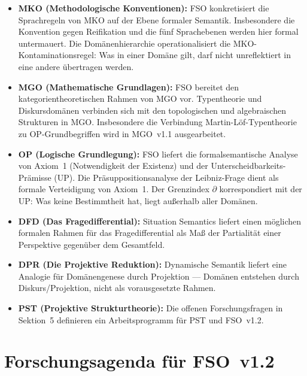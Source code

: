 \documentclass[11pt,a4paper]{article}
\theoremstyle{plain}
\theoremstyle{definition}
\begin{document}
\begin{itemize}
  \item \textbf{MKO (Methodologische Konventionen):} FSO konkretisiert die
        Sprachregeln von MKO auf der Ebene formaler Semantik. Insbesondere die
        Konvention gegen Reifikation und die f\"{u}nf Sprachebenen werden hier
        formal untermauert. Die Dom\"{a}nenhierarchie operationalisiert die
        MKO-Kontaminationsregel: Was in einer Dom\"{a}ne gilt, darf nicht
        unreflektiert in eine andere \"{u}bertragen werden.
  \item \textbf{MGO (Mathematische Grundlagen):} FSO bereitet den
        kategorientheoretischen Rahmen von MGO vor. Typentheorie und
        Diskursdom\"{a}nen verbinden sich mit den topologischen und algebraischen
        Strukturen in MGO. Insbesondere die Verbindung Martin-L\"{o}f-Typentheorie
        zu OP-Grundbegriffen wird in MGO~v1.1 ausgearbeitet.
  \item \textbf{OP (Logische Grundlegung):} FSO liefert die formalsemantische
        Analyse von Axiom~1 (Notwendigkeit der Existenz) und der
        Unterscheidbarkeits-Pr\"{a}misse (UP). Die Pr\"{a}suppositionsanalyse der
        Leibniz-Frage dient als formale Verteidigung von Axiom~1. Der Grenzindex
        $\partial$ korrespondiert mit der UP: Was keine Bestimmtheit hat, liegt
        au\ss{}erhalb aller Dom\"{a}nen.
  \item \textbf{DFD (Das Fragedifferential):} Situation Semantics liefert einen
        m\"{o}glichen formalen Rahmen f\"{u}r das Fragedifferential als Ma\ss{} der
        Partialit\"{a}t einer Perspektive gegen\"{u}ber dem Gesamtfeld.
  \item \textbf{DPR (Die Projektive Reduktion):} Dynamische Semantik liefert
        eine Analogie f\"{u}r Dom\"{a}nengenese durch Projektion --- Dom\"{a}nen
        entstehen durch Diskurs/Projektion, nicht als vorausgesetzte Rahmen.
  \item \textbf{PST (Projektive Strukturtheorie):} Die offenen Forschungsfragen
        in Sektion~5 definieren ein Arbeitsprogramm f\"{u}r PST und FSO~v1.2.
\end{itemize}

\section{Forschungsagenda f\"{u}r FSO~v1.2}
\end{document}
